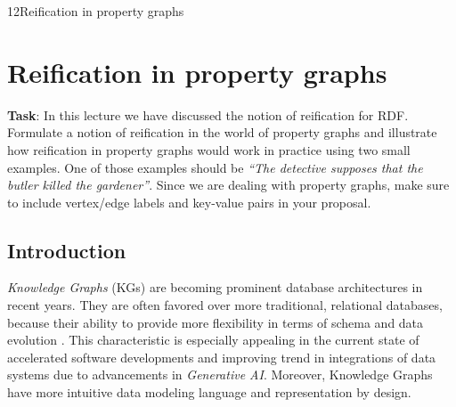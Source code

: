 \begin{question}{1}{2}{Reification in property graphs}


\section{Reification in property graphs}

\textbf{Task}: In this lecture we have discussed the notion of reification for RDF. Formulate a notion of reification in the world of property graphs and illustrate how reification in property graphs would work in practice using two small examples. One of those examples should be \emph{``The detective supposes that the butler killed the gardener''}. Since we are dealing with property graphs, make sure to include vertex/edge labels and key-value pairs in your proposal.

\subsection{Introduction}

\textit{Knowledge Graphs} (KGs) \cite{hogan_knowledge_2022, angles_survey_2008} are becoming prominent database architectures in recent years. They are often favored over more traditional, relational databases, because their ability to provide more flexibility in terms of schema and data evolution \cite{hogan_knowledge_2022, angles_survey_2008}. This characteristic is especially appealing in the current state of accelerated software developments and improving trend in integrations of data systems due to advancements in \textit{Generative AI}. Moreover, Knowledge Graphs have more intuitive data modeling language and representation by design.


\end{question}
